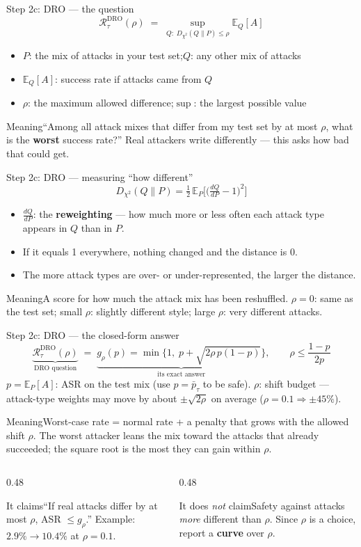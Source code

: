 \documentclass[aspectratio=169,11pt]{beamer}
\newcommand{\pbar}{\bar p_\tau}
\newcommand{\plain}[1]{\begin{block}{Meaning}#1\end{block}}
\newcommand{\claims}[2]{%
  \begin{columns}[T]
    \begin{column}{0.48\textwidth}
      \begin{exampleblock}{It claims}#1\end{exampleblock}
    \end{column}
    \begin{column}{0.48\textwidth}
      \begin{alertblock}{It does \emph{not} claim}#2\end{alertblock}
    \end{column}
  \end{columns}}
\begin{document}
\begin{frame}{Step 2c: DRO --- the question \cite{duchi2021dro,bental2013robust}}
  \[
    \mathcal{R}^{\mathrm{DRO}}_\tau(\rho) \;=\; \sup_{Q:\; D_{\chi^2}(Q\|P)\le\rho} \mathbb{E}_Q[A]
  \]
  \small
  \begin{itemize}
    \item $P$: the mix of attacks in your test set;\quad $Q$: any other mix of attacks
    \item $\mathbb{E}_Q[A]$: success rate if attacks came from $Q$
    \item $\rho$: the maximum allowed difference;\quad $\sup$: the largest possible value
  \end{itemize}
  \plain{``Among all attack mixes that differ from my test set by at most $\rho$, what is the \textbf{worst} success rate?'' Real attackers write differently --- this asks how bad that could get.}
\end{frame}

\begin{frame}{Step 2c: DRO --- measuring ``how different''}
  \[
    D_{\chi^2}(Q\|P) = \tfrac12\,\mathbb{E}_P\!\Big[\Big(\tfrac{dQ}{dP}-1\Big)^2\Big]
  \]
  \begin{itemize}
    \item $\frac{dQ}{dP}$: the \textbf{reweighting} --- how much more or less often each attack type appears in $Q$ than in $P$.
    \item If it equals 1 everywhere, nothing changed and the distance is 0.
    \item The more attack types are over- or under-represented, the larger the distance.
  \end{itemize}
  \plain{A score for how much the attack mix has been reshuffled. $\rho=0$: same as the test set; small $\rho$: slightly different style; large $\rho$: very different attacks.}
\end{frame}

\begin{frame}{Step 2c: DRO --- the closed-form answer}
  \[
    \underbrace{\mathcal{R}^{\mathrm{DRO}}_\tau(\rho)}_{\text{DRO question}}
    \;=\;
    \underbrace{g_\rho(p) = \min\Big\{1,\; p + \sqrt{2\rho\,p(1-p)}\Big\}}_{\text{its exact answer}},
    \qquad \rho \le \frac{1-p}{2p}
  \]
  \small
  $p = \mathbb{E}_P[A]$: ASR on the test mix (use $p=\pbar$ to be safe).\quad
  $\rho$: shift budget --- attack-type weights may move by about $\pm\sqrt{2\rho}$ on average ($\rho=0.1 \Rightarrow \pm45\%$).
  \plain{Worst-case rate = normal rate + a penalty that grows with the allowed shift $\rho$. The worst attacker leans the mix toward the attacks that already succeeded; the square root is the most they can gain within $\rho$.}
  \claims{``If real attacks differ by at most $\rho$, ASR $\le g_\rho$.'' Example: $2.9\% \to 10.4\%$ at $\rho=0.1$.}
  {Safety against attacks \emph{more} different than $\rho$. Since $\rho$ is a choice, report a \textbf{curve} over $\rho$.}
\end{frame}
\end{document}
